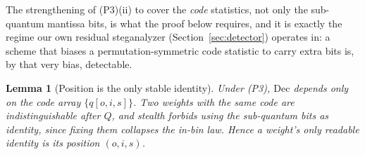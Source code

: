 \documentclass[10pt,journal]{IEEEtran}
\newtheorem{lemma}{Lemma}
\theoremstyle{remark}
\begin{document}
The strengthening of (P3)(ii) to cover the \emph{code} statistics, not only the sub-quantum
mantissa bits, is what the proof below requires, and it is exactly the regime our own residual
steganalyzer (Section~\ref{sec:detector}) operates in: a scheme that biases a permutation-symmetric
code statistic to carry extra bits is, by that very bias, detectable.

\begin{lemma}[Position is the only stable identity]\label{lem:pos}
Under \textup{(P3)}, $\mathrm{Dec}$ depends only on the code array $\{q[o,i,s]\}$.
Two weights with the same code are indistinguishable after $Q$, and stealth forbids
using the sub-quantum bits as identity, since fixing them collapses the in-bin law.
Hence a weight's only readable identity is its position $(o,i,s)$.
\end{lemma}
\end{document}
